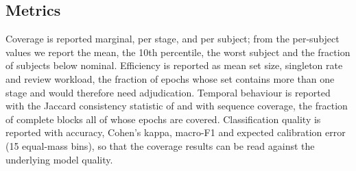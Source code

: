 \subsection{Metrics}
\label{sec:metrics}

Coverage is reported marginal, per stage, and per subject; from the
per-subject values we report the mean, the 10th percentile, the worst subject
and the fraction of subjects below nominal. Efficiency is reported as mean set
size, singleton rate and review workload, the fraction of epochs whose set
contains more than one stage and would therefore need adjudication. Temporal
behaviour is reported with the
Jaccard consistency statistic of  and with sequence
coverage, the fraction of complete blocks all of whose epochs are covered.
Classification quality is reported with accuracy, Cohen's kappa, macro-F1 and
expected calibration error (15 equal-mass bins), so that the coverage results
can be read against the underlying model quality.

